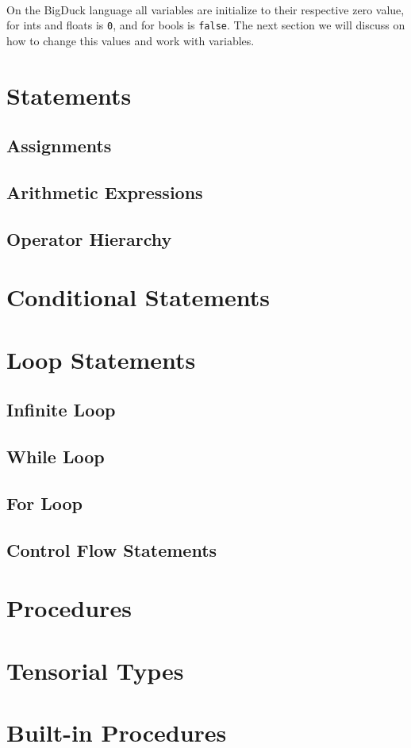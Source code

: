 \paragraph{} On the BigDuck language all variables are initialize to their
respective zero value, for ints and floats is \texttt{0}, and for bools is
\texttt{false}. The next section we will discuss on how to change this values
and work with variables.

\section{Statements}
\subsection{Assignments}
\subsection{Arithmetic Expressions}
\subsection{Operator Hierarchy}

\section{Conditional Statements}

\section{Loop Statements}
\subsection{Infinite Loop}
\subsection{While Loop}
\subsection{For Loop}
\subsection{Control Flow Statements}

\section{Procedures}

\section{Tensorial Types}

\section{Built-in Procedures}
